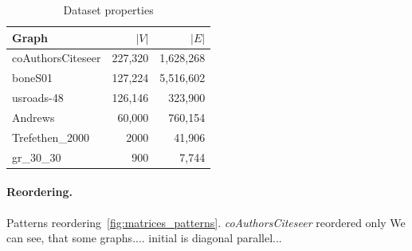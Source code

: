 \begin{table}[ht]
\centering
\caption{Dataset properties}
\label{tab:datasets}
\begin{tabular}{l r r}
\hline
Graph & \(|V|\) & \(|E|\) \\
\hline
coAuthorsCiteseer & 227,320 & 1,628,268  \\
boneS01 & 127,224 & 5,516,602  \\
usroads-48 & 126,146 & 323,900 \\
Andrews & 60,000 & 760,154 \\
Trefethen\_2000 & 2000 & 41,906 \\
gr\_30\_30 & 900 & 7,744 \\
\hline
\end{tabular}
\end{table}

\paragraph{Reordering.} Patterns reordering~\ref{fig:matrices_patterns}. 
\emph{coAuthorsCiteseer} reordered only
We can see, that some graphs.... initial is diagonal parallel...

